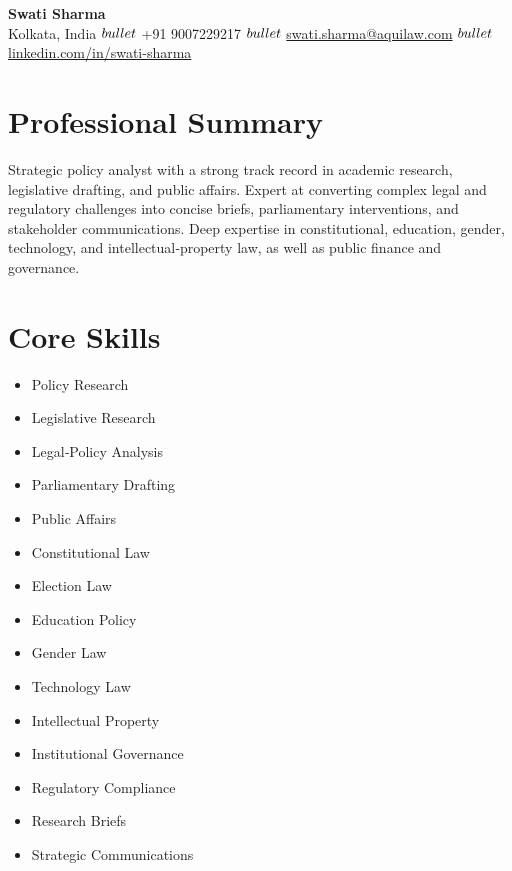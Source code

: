 \documentclass[11pt,letterpaper]{article}
\begin{document}
\begin{center}
    {\Huge \textbf{Swati Sharma}} \\
    Kolkata, India $\\bullet$ +91 9007229217 $\\bullet$ \href{mailto:swati.sharma@aquilaw.com}{swati.sharma@aquilaw.com} $\\bullet$ \href{https://linkedin.com/in/swati-sharma}{linkedin.com/in/swati-sharma}
\end{center}

\vspace{4pt}

\section{Professional Summary}
Strategic policy analyst with a strong track record in academic research, legislative drafting, and public affairs. Expert at converting complex legal and regulatory challenges into concise briefs, parliamentary interventions, and stakeholder communications. Deep expertise in constitutional, education, gender, technology, and intellectual‑property law, as well as public finance and governance.

\section{Core Skills}
\begin{itemize}[leftmargin=*, noitemsep]
    \item Policy Research
    \item Legislative Research
    \item Legal‑Policy Analysis
    \item Parliamentary Drafting
    \item Public Affairs
    \item Constitutional Law
    \item Election Law
    \item Education Policy
    \item Gender Law
    \item Technology Law
    \item Intellectual Property
    \item Institutional Governance
    \item Regulatory Compliance
    \item Research Briefs
    \item Strategic Communications
\end{itemize}
\end{document}
